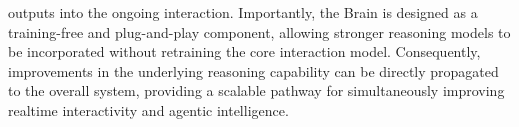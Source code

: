 outputs into the ongoing interaction. Importantly, the Brain is designed as a training-free and plug-and-play component, allowing stronger reasoning models to be incorporated without retraining the core interaction model. Consequently, improvements in the underlying reasoning capability can be directly propagated to the overall system, providing a scalable pathway for simultaneously improving realtime interactivity and agentic intelligence.









